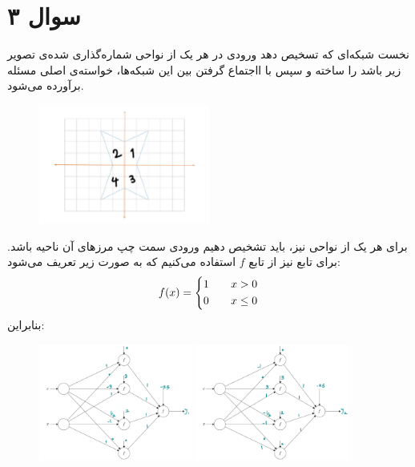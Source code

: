 \documentclass[a4paper, 12pt]{article}
\begin{document}
\section*{سوال ۳}
نخست شبکه‌ای که تسخیص دهد ورودی در هر یک از نواحی شماره‌گذاری شده‌ی تصویر زیر باشد را ساخته و سپس با ااجتماع گرفتن بین این شبکه‌ها، خواسته‌ی اصلی مسئله برآورده می‌شود.
\begin{figure}[H]
	\centering
	\includegraphics[width=0.5\textwidth]{3.png}
\end{figure}
\noindent
برای هر یک از نواحی نیز، باید تشخیص دهیم ورودی سمت چپ مرزهای آن ناحیه باشد. برای تابع  نیز از تابع $f$ استفاده می‌کنیم که به صورت زیر تعریف می‌شود:
\[
f(x) = \begin{dcases}
	1 &\quad x > 0\\
	0 &\quad x \le 0
\end{dcases}
\]
بنابراین:
\begin{figure}[H]
	\centering
	\includegraphics[width=0.45\textwidth]{3-2.png}
	\hspace*{0.05\textwidth}
	\includegraphics[width=0.45\textwidth]{3-4.png}
\end{figure}
\end{document}
